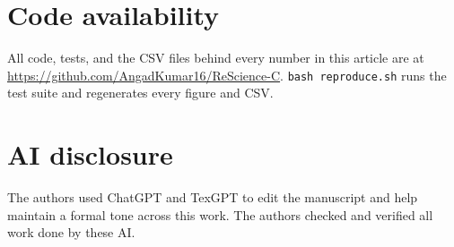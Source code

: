 \documentclass[a4paper, oneside, 10pt]{article}
\begin{document}
\section*{Code availability}

All code, tests, and the CSV files behind every number in this article are at \url{https://github.com/AngadKumar16/ReScience-C}. \texttt{bash reproduce.sh} runs the test suite and regenerates every figure and CSV.

\section*{AI disclosure}

The authors used ChatGPT and TexGPT to edit the manuscript and help maintain a formal tone across this work. The authors checked and verified all work done by these AI. 

\hypersetup{linkcolor=black,urlcolor=darkgray}
\renewcommand\emph[1]{{\bfseries #1}}
\setlength\bibitemsep{0pt}
\printbibliography
\end{document}
